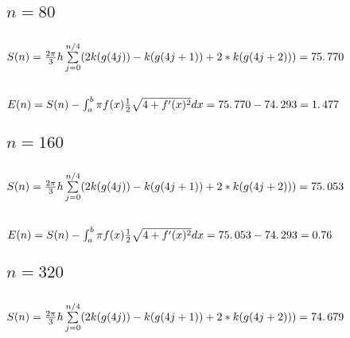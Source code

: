 \documentclass{article}
\begin{document}
\bigskip 

\subsection{$n=80$}

\subsection{$S(n)=\frac{2\protect\pi }{3}h\sum%
\limits_{j=0}^{n/4}(2k(g(4j))-k(g(4j+1))+2\ast k(g(4j+2)))=\allowbreak
75.\,\allowbreak 770$}

\subsection{$E(n)=S(n)-\protect\int_{a}^{b}\protect\pi f(x)\frac{1}{2}%
\protect\sqrt{4+f^{\prime }(x)^{2}}dx=\allowbreak 75.\,\allowbreak
770-\allowbreak \allowbreak 74.\,\allowbreak 293=\allowbreak 1.\,\allowbreak
477$}

\bigskip 

\subsection{$n=160$}

\subsection{$S(n)=\frac{2\protect\pi }{3}h\sum%
\limits_{j=0}^{n/4}(2k(g(4j))-k(g(4j+1))+2\ast k(g(4j+2)))=75.\,\allowbreak
053\allowbreak $}

\subsection{$E(n)=S(n)-\protect\int_{a}^{b}\protect\pi f(x)\frac{1}{2}%
\protect\sqrt{4+f^{\prime }(x)^{2}}dx=\allowbreak 75.\,\allowbreak
053\allowbreak -\allowbreak \allowbreak 74.\,\allowbreak 293=\allowbreak 0.76
$}

\bigskip 

\subsection{$n=320$}

\subsection{$S(n)=\frac{2\protect\pi }{3}h\sum%
\limits_{j=0}^{n/4}(2k(g(4j))-k(g(4j+1))+2\ast k(g(4j+2)))=\allowbreak
74.\,\allowbreak 679$}
\end{document}
